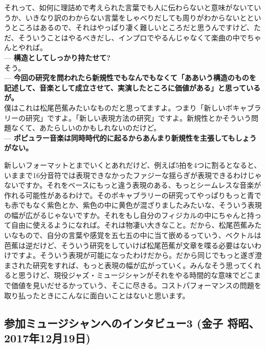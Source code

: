 \documentclass[uplatex,dvipdfmx]{ujarticle}
\begin{document}
\begin{description}
それって、如何に理詰めで考えられた言葉でも人に伝わらないと意味がないていうか、いきなり訳のわからない言葉をしゃべりだしても周りがわからないとというところはあるので、それはやっぱり凄く難しいところだと思うんですけど、ただ、そういうことはやるべきだし、インプロでやるんじゃなくて楽曲の中でちゃんとやれば。\\

--- {\bf 構造としてしっかり持たせて?}\\

そう。\\

--- {\bf 今回の研究を問われたら新規性でもなんでもなくて「ああいう構造のものを記述して、音楽として成立させて、実演したところに価値がある」と思っているが。}\\

僕はこれは松尾芭蕉みたいなものだと思ってますよ。つまり「新しいボキャブラリーの研究」ですよ。「新しい表現方法の研究」ですよ。新規性とかそういう問題なくて、あたらしいのかもしれないのだけど。\\

--- {\bf ポピュラー音楽は同時時代的に起るからあんまり新規性を主張してもしょうがない。}

新しいフォーマットとまでいくとあれだけど、例えば5拍を4つに割るとなると、いままで16分音符では表現できなかったファジーな揺らぎが表現できるわけじゃないですか。それをベースにもっと違う表現のある、もっとシームレスな音楽が作れる可能性があるわけで。そのボキャブラリーの研究ってやっぱりもっと青でも赤でもなく紫色とか、紫色の中に黄色が混ざりましたみたいな、そういう表現の幅が広がるじゃないですか。それをもし自分のフィジカルの中にちゃんと持って自由に使えるようになれば。それは物凄い大きなこと。だから、松尾芭蕉みたいなもので、自分の言葉や感覚を五七五の中に当て嵌めるっていう、ベクトルは芭蕉は逆だけど、そういう研究をしていけば松尾芭蕉が文章を喋る必要はないわけですよ。そういう表現が可能になったわけだから。だから同じでもっと遂ぎ澄まされた研究をすれば、もっと表現の幅が広がっていく。みんなそう思ってくれると思うけど、現役ジャズ・ミュージシャンがそれをやる時間的な意味でどこまで価値を見いだせるかっていう、そこに尽きる。コストパフォーマンスの問題を取り払ったときにこんなに面白いことはないと思います。
\end{description}

\subsection{参加ミュージシャンへのインタビュー3 (金子 将昭、2017年12月19日)}
\end{document}
